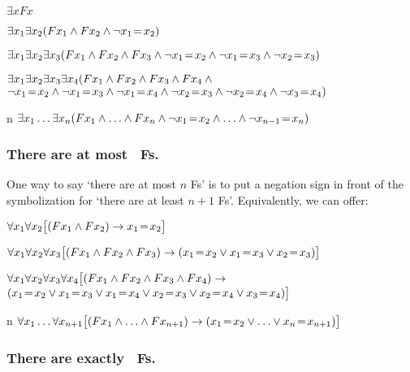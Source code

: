 \begin{ekey}
\item[\text{one}] $\exists xFx$
\item[\text{two}] $\exists x_1\exists x_2(Fx_1 \mathbin{\wedge} Fx_2 \mathbin{\wedge} \neg x_1  \!=\!  x_2)$
\item[\text{three}] $\exists x_1\exists x_2\exists x_3(Fx_1 \mathbin{\wedge} Fx_2 \mathbin{\wedge} Fx_3 \mathbin{\wedge} \neg x_1 \!=\!  x_2 \mathbin{\wedge}\neg x_1 \!=\!  x_3 \mathbin{\wedge} \neg x_2 \!=\!  x_3)$
\item[\text{four}] $\exists x_1\exists x_2\exists x_3\exists x_4 (Fx_1 \mathbin{\wedge} Fx_2 \mathbin{\wedge} Fx_3 \mathbin{\wedge} Fx_4 \mathbin{\wedge} \phantom{x}$\\
\phantom{$\exists x_1\exists x_2$}$\enot x_1 \eid  x_2 \eand \enot x_1 \eid  x_3 \eand \enot x_1 \eid  x_4 \eand \enot x_2 \eid  x_3 \eand \enot x_2 \eid  x_4 \eand \enot x_3 \eid  x_4)$
\item[n] $\exists x_1\ldots\exists x_n(Fx_1 \mathbin{\wedge}\ldots\mathbin{\wedge} Fx_n \mathbin{\wedge} \neg x_1 \!=\!  x_2 \mathbin{\wedge}\ldots\mathbin{\wedge} \neg x_{n-1} \!=\!  x_n)$ 
\end{ekey}

\subsubsection*{There are at most \blank\ Fs.}
\label{summary.atmost}

One way to say `there are at most $n$ Fs' is to put a negation sign in front of the symbolization for `there are at least $n+1$ Fs'. Equivalently, we can offer:
\begin{ekey}
\item[\text{one}] $\forall x_1\forall x_2\bigl[(Fx_1 \mathbin{\wedge} Fx_2) \rightarrow x_1\!=\! x_2\bigr]$
\item[\text{two}] $\forall x_1\forall x_2\forall x_3\bigl[(Fx_1 \mathbin{\wedge} Fx_2 \mathbin{\wedge} Fx_3) \rightarrow (x_1\!=\! x_2 \vee x_1\!=\! x_3 \vee x_2\!=\! x_3)\bigr]$
\item[\text{three}] $\forall x_1\forall x_2\forall x_3\forall x_4\bigl[(Fx_1 \mathbin{\wedge} Fx_2 \mathbin{\wedge} Fx_3 \mathbin{\wedge} Fx_4) \rightarrow \phantom{.}$\\
\phantom{$\exists x_1 \exists x_2$}$(x_1\eid x_2 \eor x_1\eid x_3 \eor x_1\eid x_4 \eor x_2\eid x_3 \eor x_2\eid x_4 \eor x_3\eid x_4)\bigr]$
\item[n]$\forall x_1\ldots\forall x_{n+1}
\bigl[(Fx_1\mathbin{\wedge} \ldots \mathbin{\wedge} Fx_{n+1}) \rightarrow (x_1\!=\! x_2 \vee \ldots \vee x_n\!=\! x_{n+1})\bigr]$ 
\end{ekey}

\subsubsection*{There are exactly \blank\ Fs.}
\label{summary.exactly}

